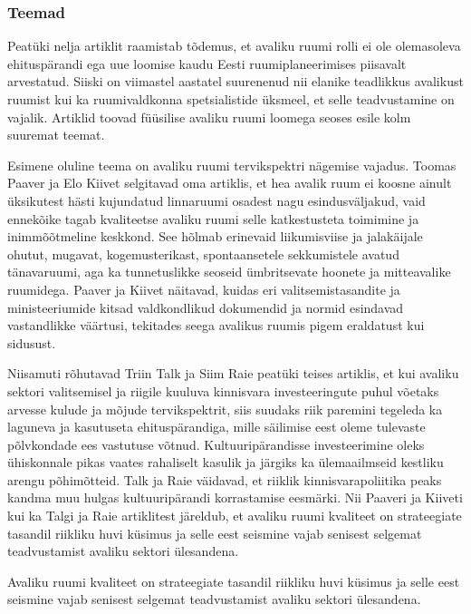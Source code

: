 \documentclass[estonian,]{article}
\begin{document}
\hypertarget{teemad}{%
\subsubsection*{Teemad}\label{teemad}}

Peatüki nelja artiklit raamistab tõdemus, et avaliku ruumi rolli ei ole olemasoleva ehituspärandi ega uue loomise kaudu Eesti ruumiplaneerimises piisavalt arvestatud. Siiski on viimastel aastatel suurenenud nii elanike teadlikkus avalikust ruumist kui ka ruumivaldkonna spetsialistide üksmeel, et selle teadvustamine on vajalik. Artiklid toovad füüsilise avaliku ruumi loomega seoses esile kolm suuremat teemat.

Esimene oluline teema on avaliku ruumi tervikspektri nägemise vajadus. Toomas Paaver ja Elo Kiivet selgitavad oma artiklis, et hea avalik ruum ei koosne ainult üksikutest hästi kujundatud linnaruumi osadest nagu esindusväljakud, vaid ennekõike tagab kvaliteetse avaliku ruumi selle katkestusteta toimimine ja inimmõõtmeline keskkond. See hõlmab erinevaid liikumisviise ja jalakäijale ohutut, mugavat, kogemusterikast, spontaansetele sekkumistele avatud tänavaruumi, aga ka tunnetuslikke seoseid ümbritsevate hoonete ja mitteavalike ruumidega. Paaver ja Kiivet näitavad, kuidas eri valitsemistasandite ja ministeeriumide kitsad valdkondlikud dokumendid ja normid esindavad vastandlikke väärtusi, tekitades seega avalikus ruumis pigem eraldatust kui sidusust.

Niisamuti rõhutavad Triin Talk ja Siim Raie peatüki teises artiklis, et kui avaliku sektori valitsemisel ja riigile kuuluva kinnisvara investeeringute puhul võetaks arvesse kulude ja mõjude tervikspektrit, siis suudaks riik paremini tegeleda ka laguneva ja kasutuseta ehituspärandiga, mille säilimise eest oleme tulevaste põlvkondade ees vastutuse võtnud. Kultuuripärandisse investeerimine oleks ühiskonnale pikas vaates rahaliselt kasulik ja järgiks ka ülemaailmseid kestliku arengu põhimõtteid. Talk ja Raie väidavad, et riiklik kinnisvarapoliitika peaks kandma muu hulgas kultuuripärandi korrastamise eesmärki. Nii Paaveri ja Kiiveti kui ka Talgi ja Raie artiklitest järeldub, et avaliku ruumi kvaliteet on strateegiate tasandil riikliku huvi küsimus ja selle eest seismine vajab senisest selgemat teadvustamist avaliku sektori ülesandena.

\begin{blockquote-right}
Avaliku ruumi kvaliteet on strateegiate tasandil riikliku huvi küsimus
ja selle eest seismine vajab senisest selgemat teadvustamist avaliku
sektori ülesandena.
\end{blockquote-right}
\end{document}
